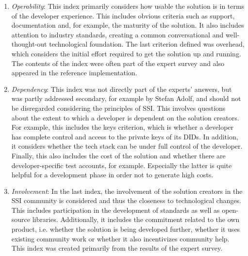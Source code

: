 \begin{enumerate}
        \item \textit{Operability}: This index primarily considers how usable the solution is in terms of the developer experience. This includes obvious criteria such as support, documentation and, for example, the maturity of the solution. It also includes attention to industry standards, creating a common conversational and well-thought-out technological foundation. The last criterion defined was overhead, which considers the initial effort required to get the solution up and running. The contents of the index were often part of the expert survey and also appeared in the reference implementation.
        \item \textit{Dependency}: This index was not directly part of the experts' answers, but was partly addressed secondary, for example by Stefan Adolf, and should not be disregarded considering the principles of \ac{SSI}. This involves questions about the extent to which a developer is dependent on the solution creators. For example, this includes the keys criterion, which is whether a developer has complete control and access to the private keys of its \acp{DID}. In addition, it considers whether the tech stack can be under full control of the developer. Finally, this also includes the cost of the solution and whether there are developer-specific test accounts, for example. Especially the latter is quite helpful for a development phase in order not to generate high costs.
        \item \textit{Involvement}: In the last index, the involvement of the solution creators in the \ac{SSI} community is considered and thus the closeness to technological changes. This includes participation in the development of standards as well as open-source libraries. Additionally, it includes the commitment related to the own product, i.e. whether the solution is being developed further, whether it uses existing community work or whether it also incentivizes community help. This index was created primarily from the results of the expert survey.
    \end{enumerate}
	
